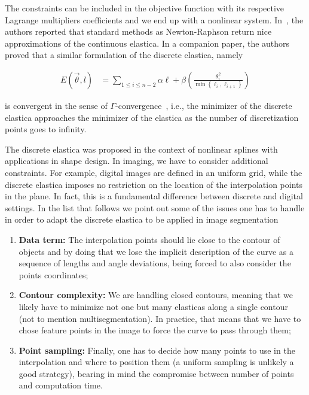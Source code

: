 The constraints can be included in the objective function with its respective Lagrange multipliers coefficients and we end up with a nonlinear system. In~\cite{bruckstein01discrete}, the authors reported that standard methods as Newton-Raphson return nice approximations of the continuous elastica. In a companion paper, the authors proved that a similar formulation of the discrete elastica, namely


\begin{align}
	E(\vec{\theta},l) &= \sum_{1 \leq i \leq n-2}{ \alpha \ell + \beta \left( \frac{\theta_i^2}{\min \left\{{\ell_i,\ell_{i+1}} \right\} }\right)}
	\label{ch3:eq:discrete-elastica}
\end{align}

is convergent in the sense of $\Gamma$-convergence~\cite{bruckstein01epi}, i.e., the minimizer of the discrete elastica approaches the minimizer of the elastica as the number of discretization points goes to infinity. 

The discrete elastica was proposed in the context of nonlinear splines with applications in shape design. In imaging, we have to consider additional constraints. For example,  digital images are defined in an uniform grid, while the discrete elastica imposes no restriction on the location of the interpolation points in the plane. In fact, this is a fundamental difference between discrete and digital settings. In the list that follows we point out some of the issues one has to handle in order to adapt the discrete elastica to be applied in image segmentation

\begin{enumerate}
	\item{\textbf{Data term:} The interpolation points should lie close to the contour of objects and by doing that we lose the implicit description of the curve as a sequence of lengths and angle deviations, being forced to also consider the points coordinates;}
	\item{\textbf{Contour complexity:} We are handling closed contours, meaning that we likely have to minimize not one but many elasticas along a single contour (not to mention multisegmentation). In practice, that means that we have to chose feature points in the image to force the curve to pass through them;}
	\item{\textbf{Point sampling:} Finally, one has to decide how many points to use in the interpolation and where to position them (a uniform sampling is unlikely a good strategy), bearing in mind the compromise between number of points and computation time.}
\end{enumerate}




